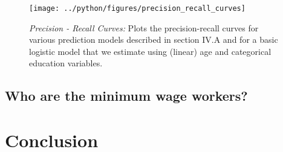 \documentclass[11pt, a4paper, leqno]{article}
\begin{document}
\begin{figure}[H]

    \centering
    \texttt{[image: ../python/figures/precision\_recall\_curves]}

    \caption{\emph{Precision - Recall Curves:} Plots the precision-recall curves for various
    prediction models described in section IV.A and for a basic logistic model that we
    estimate using (linear) age and categorical education variables. }
    \label{fig:python-predictions}

\end{figure}




\subsection{Who are the minimum wage workers?}


\section{Conclusion}
\label{sec:conclusion}

\printbibliography
{}



\end{document}
